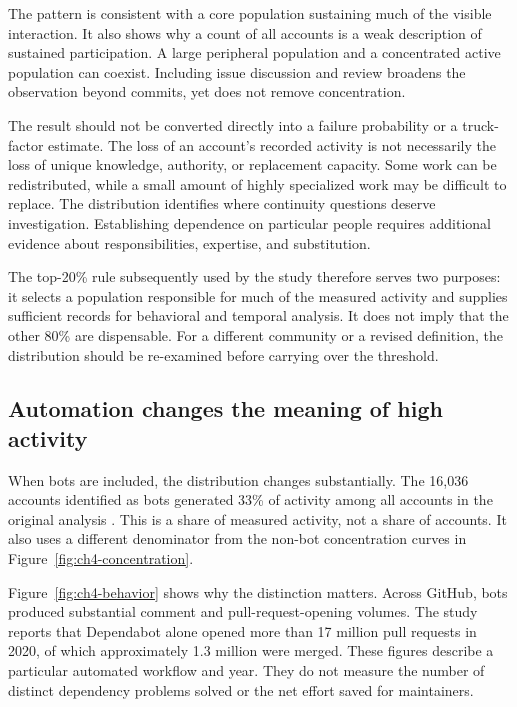 The pattern is consistent with a core population sustaining much of the visible interaction. It also shows why a count of all accounts is a weak description of sustained participation. A large peripheral population and a concentrated active population can coexist. Including issue discussion and review broadens the observation beyond commits, yet does not remove concentration.

The result should not be converted directly into a failure probability or a truck-factor estimate. The loss of an account's recorded activity is not necessarily the loss of unique knowledge, authority, or replacement capacity. Some work can be redistributed, while a small amount of highly specialized work may be difficult to replace. The distribution identifies where continuity questions deserve investigation. Establishing dependence on particular people requires additional evidence about responsibilities, expertise, and substitution.

The top-20\% rule subsequently used by the study therefore serves two purposes: it selects a population responsible for much of the measured activity and supplies sufficient records for behavioral and temporal analysis. It does not imply that the other 80\% are dispensable. For a different community or a revised definition, the distribution should be re-examined before carrying over the threshold.

\subsection{Automation changes the meaning of high activity}
When bots are included, the distribution changes substantially. The 16,036 accounts identified as bots generated 33\% of activity among all accounts in the original analysis \citep[Section V.A]{xia2022}. This is a share of measured activity, not a share of accounts. It also uses a different denominator from the non-bot concentration curves in Figure~\ref{fig:ch4-concentration}.

Figure~\ref{fig:ch4-behavior} shows why the distinction matters. Across GitHub, bots produced substantial comment and pull-request-opening volumes. The study reports that Dependabot alone opened more than 17 million pull requests in 2020, of which approximately 1.3 million were merged. These figures describe a particular automated workflow and year. They do not measure the number of distinct dependency problems solved or the net effort saved for maintainers.

